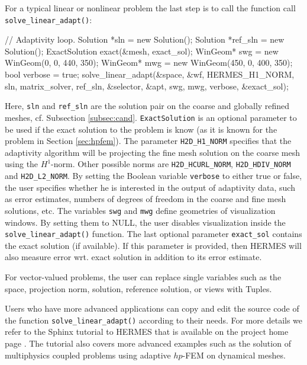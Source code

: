 \documentclass[final,3p,times,twocolumn]{elsarticle}
\begin{document}
For a typical linear or nonlinear problem the last step is to call the 
function call {\tt solve\_linear\_adapt()}:

\begin{code}
  // Adaptivity loop.
  Solution *sln = new Solution();
  Solution *ref_sln = new Solution();
  ExactSolution exact(&mesh, exact_sol);
  WinGeom* swg = new WinGeom(0, 0, 440, 350);
  WinGeom* mwg = new WinGeom(450, 0, 400, 350);
  bool verbose = true;    
  solve_linear_adapt(&space, &wf, HERMES_H1_NORM, sln, 
                     matrix_solver, ref_sln, 
                     &selector, &apt, swg, mwg, 
                     verbose, &exact_sol);
\end{code}
Here, {\tt sln} and {\tt ref\_sln} are the 
solution pair on the coarse and globally refined 
meshes, cf. Subsection \ref{subsec:cand}.
{\tt ExactSolution} is an optional parameter to be used
if the exact solution to the problem is know (as
it is known for the problem in Section \ref{sec:hpfem}).
The parameter {\tt H2D\_H1\_NORM} specifies that the
adaptivity algorithm will be projecting the fine mesh
solution on the coarse mesh using the $H^1$-norm. 
Other possible norms are {\tt H2D\_HCURL\_NORM},
{\tt H2D\_HDIV\_NORM} and {\tt H2D\_L2\_NORM}.
By setting the Boolean variable {\tt verbose} to either 
true or false, the user specifies whether he is 
interested in the output of adaptivity data, such as 
error estimates, numbers of degrees of freedom in the 
coarse and fine mesh solutions, etc. The variables
{\tt swg} and {\tt mwg} define geometries of 
visualization windows. By setting them to NULL, the
user disables visualization inside the {\tt solve\_linear\_adapt()}
function. The last optional parameter {\tt exact\_sol}
contains the exact solution (if available). If this 
parameter is provided, then HERMES will also measure
error wrt. exact solution in addition to its error
estimate. 

For vector-valued problems, the 
user can replace single variables such as 
the space, projection norm, solution, reference solution, 
or views with Tuples.

Users who have more advanced applications can copy and 
edit the source code of the function {\tt solve\_linear\_adapt()}
according to their needs. For more details we refer to the 
Sphinx tutorial to HERMES that is available on the 
project home page \cite{hermes}. The tutorial also covers more advanced 
examples such as the solution of multiphysics coupled problems
using adaptive $hp$-FEM on dynamical meshes.   
\end{document}
